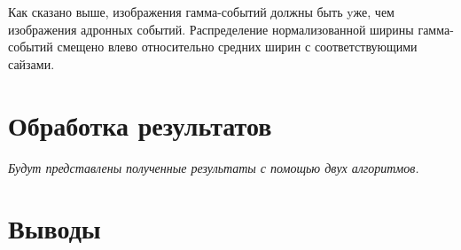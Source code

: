 \documentclass[magd,floatypics,numeref]{msudipl} %
\begin{document}
Как сказано выше, изображения гамма-событий должны быть yже, чем изображения адронных событий. Распределение нормализованной ширины гамма-событий смещено влево относительно средних ширин с соответствующими сайзами. 
\chapter{Обработка результатов}
\textit{Будут представлены полученные результаты с помощью двух алгоритмов. }
\chapter*{Выводы}   %


{}  %
\printbibliography[title=Литература]
\end{document}

